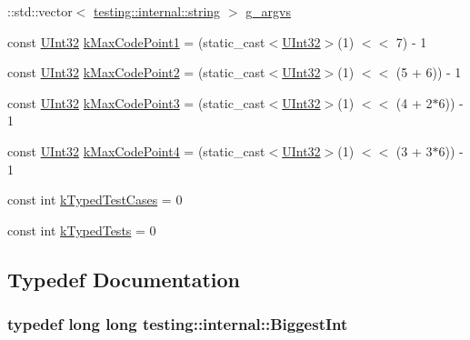 \begin{DoxyCompactItemize}
\item 
\+::std\+::vector$<$ \hyperlink{namespacetesting_1_1internal_a8e8ff5b11e64078831112677156cb111}{testing\+::internal\+::string} $>$ \hyperlink{namespacetesting_1_1internal_ab7fe90df4f87f1bd8a244b0be2ccad79}{g\+\_\+argvs}
\item 
const \hyperlink{namespacetesting_1_1internal_a40d4fffcd2bf56f18b1c380615aa85e3}{U\+Int32} \hyperlink{namespacetesting_1_1internal_a128515c8ed6c0fe98e498c8042da2060}{k\+Max\+Code\+Point1} = (static\+\_\+cast$<$\hyperlink{namespacetesting_1_1internal_a40d4fffcd2bf56f18b1c380615aa85e3}{U\+Int32}$>$(1) $<$$<$ 7) -\/ 1
\item 
const \hyperlink{namespacetesting_1_1internal_a40d4fffcd2bf56f18b1c380615aa85e3}{U\+Int32} \hyperlink{namespacetesting_1_1internal_ab8f4a5ed784352f00342cfeadc72337e}{k\+Max\+Code\+Point2} = (static\+\_\+cast$<$\hyperlink{namespacetesting_1_1internal_a40d4fffcd2bf56f18b1c380615aa85e3}{U\+Int32}$>$(1) $<$$<$ (5 + 6)) -\/ 1
\item 
const \hyperlink{namespacetesting_1_1internal_a40d4fffcd2bf56f18b1c380615aa85e3}{U\+Int32} \hyperlink{namespacetesting_1_1internal_aa42bd507418e570402996e33582beed3}{k\+Max\+Code\+Point3} = (static\+\_\+cast$<$\hyperlink{namespacetesting_1_1internal_a40d4fffcd2bf56f18b1c380615aa85e3}{U\+Int32}$>$(1) $<$$<$ (4 + 2$\ast$6)) -\/ 1
\item 
const \hyperlink{namespacetesting_1_1internal_a40d4fffcd2bf56f18b1c380615aa85e3}{U\+Int32} \hyperlink{namespacetesting_1_1internal_acd87c60be9b5fedb2d017503d8834474}{k\+Max\+Code\+Point4} = (static\+\_\+cast$<$\hyperlink{namespacetesting_1_1internal_a40d4fffcd2bf56f18b1c380615aa85e3}{U\+Int32}$>$(1) $<$$<$ (3 + 3$\ast$6)) -\/ 1
\item 
const int \hyperlink{namespacetesting_1_1internal_a685ea5332074ae63b0ded2b184ac2271}{k\+Typed\+Test\+Cases} = 0
\item 
const int \hyperlink{namespacetesting_1_1internal_a53ee2d113744f9ba1d89469db4d7388b}{k\+Typed\+Tests} = 0
\end{DoxyCompactItemize}


\subsection{Typedef Documentation}
\subsubsection[{\texorpdfstring{Biggest\+Int}{BiggestInt}}]{\setlength{\rightskip}{0pt plus 5cm}typedef long long {\bf testing\+::internal\+::\+Biggest\+Int}}\hypertarget{namespacetesting_1_1internal_a05c6bd9ede5ccdf25191a590d610dcc6}{}\label{namespacetesting_1_1internal_a05c6bd9ede5ccdf25191a590d610dcc6}


